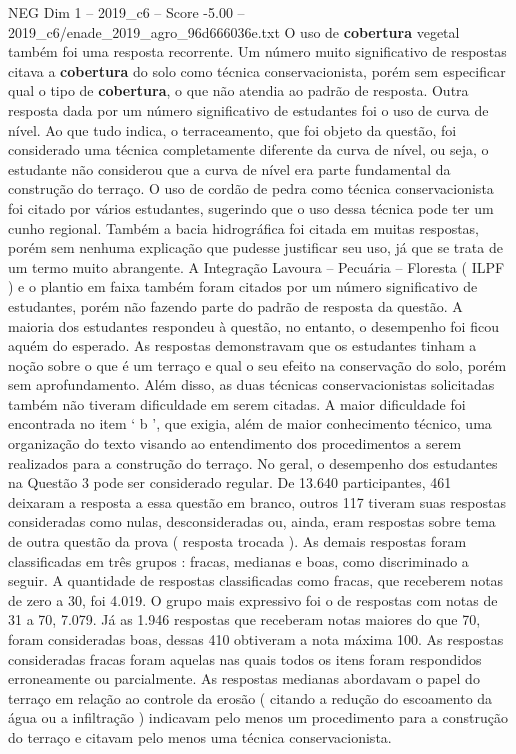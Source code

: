 \begin{textsample}{NEG Dim 1 – 2019\_c6 – Score -5.00 – 2019\_c6/enade\_2019\_agro\_96d666036e.txt}
O uso de \textbf{cobertura} vegetal também foi uma resposta recorrente.
Um número muito significativo de respostas citava a \textbf{cobertura} do solo como técnica conservacionista, porém sem especificar qual o tipo de \textbf{cobertura}, o que não atendia ao padrão de resposta.
Outra resposta dada por um número significativo de estudantes foi o uso de curva de nível.
Ao que tudo indica, o terraceamento, que foi objeto da questão, foi considerado uma técnica completamente diferente da curva de nível, ou seja, o estudante não considerou que a curva de nível era parte fundamental da construção do terraço.
O uso de cordão de pedra como técnica conservacionista foi citado por vários estudantes, sugerindo que o uso dessa técnica pode ter um cunho regional.
Também a bacia hidrográfica foi citada em muitas respostas, porém sem nenhuma explicação que pudesse justificar seu uso, já que se trata de um termo muito abrangente.
A Integração Lavoura – Pecuária – Floresta ( ILPF ) e o plantio em faixa também foram citados por um número significativo de estudantes, porém não fazendo parte do padrão de resposta da questão.
A maioria dos estudantes respondeu à questão, no entanto, o desempenho foi ficou aquém do esperado.
As respostas demonstravam que os estudantes tinham a noção sobre o que é um terraço e qual o seu efeito na conservação do solo, porém sem aprofundamento.
Além disso, as duas técnicas conservacionistas solicitadas também não tiveram dificuldade em serem citadas.
A maior dificuldade foi encontrada no item ‘ b ’, que exigia, além de maior conhecimento técnico, uma organização do texto visando ao entendimento dos procedimentos a serem realizados para a construção do terraço.
No geral, o desempenho dos estudantes na Questão 3 pode ser considerado regular.
De 13.640 participantes, 461 deixaram a resposta a essa questão em branco, outros 117 tiveram suas respostas consideradas como nulas, desconsideradas ou, ainda, eram respostas sobre tema de outra questão da prova ( resposta trocada ).
As demais respostas foram classificadas em três grupos : fracas, medianas e boas, como discriminado a seguir.
A quantidade de respostas classificadas como fracas, que receberem notas de zero a 30, foi 4.019.
O grupo mais expressivo foi o de respostas com notas de 31 a 70, 7.079.
Já as 1.946 respostas que receberam notas maiores do que 70, foram consideradas boas, dessas 410 obtiveram a nota máxima 100.
As respostas consideradas fracas foram aquelas nas quais todos os itens foram respondidos erroneamente ou parcialmente.
As respostas medianas abordavam o papel do terraço em relação ao controle da erosão ( citando a redução do escoamento da água ou a infiltração ) indicavam pelo menos um procedimento para a construção do terraço e citavam pelo menos uma técnica conservacionista.

\end{textsample}
